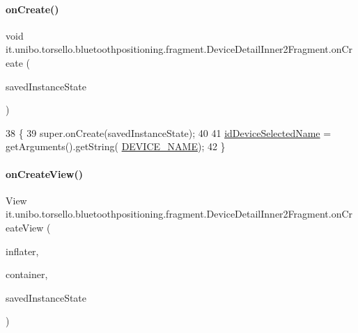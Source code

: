 \paragraph{\texorpdfstring{on\+Create()}{onCreate()}}
{\footnotesize\ttfamily void it.\+unibo.\+torsello.\+bluetoothpositioning.\+fragment.\+Device\+Detail\+Inner2\+Fragment.\+on\+Create (\begin{DoxyParamCaption}\item[{Bundle}]{saved\+Instance\+State }\end{DoxyParamCaption})}


\begin{DoxyCode}
38                                                     \{
39         super.onCreate(savedInstanceState);
40 
41         \hyperlink{classit_1_1unibo_1_1torsello_1_1bluetoothpositioning_1_1fragment_1_1DeviceDetailInner2Fragment_a84cd6ba00a3c2e8b7a53cac62c73f1b5_a84cd6ba00a3c2e8b7a53cac62c73f1b5}{idDeviceSelectedName} = getArguments().getString(
      \hyperlink{classit_1_1unibo_1_1torsello_1_1bluetoothpositioning_1_1fragment_1_1DeviceDetailInner2Fragment_aa28d537983d4cf578120a9c51eb2b0bb_aa28d537983d4cf578120a9c51eb2b0bb}{DEVICE\_NAME});
42     \}
\end{DoxyCode}
\hypertarget{classit_1_1unibo_1_1torsello_1_1bluetoothpositioning_1_1fragment_1_1DeviceDetailInner2Fragment_aaaab1478726f0d8a4b9bdfe3eab122c8_aaaab1478726f0d8a4b9bdfe3eab122c8}{}\label{classit_1_1unibo_1_1torsello_1_1bluetoothpositioning_1_1fragment_1_1DeviceDetailInner2Fragment_aaaab1478726f0d8a4b9bdfe3eab122c8_aaaab1478726f0d8a4b9bdfe3eab122c8} 
\paragraph{\texorpdfstring{on\+Create\+View()}{onCreateView()}}
{\footnotesize\ttfamily View it.\+unibo.\+torsello.\+bluetoothpositioning.\+fragment.\+Device\+Detail\+Inner2\+Fragment.\+on\+Create\+View (\begin{DoxyParamCaption}\item[{Layout\+Inflater}]{inflater,  }\item[{View\+Group}]{container,  }\item[{Bundle}]{saved\+Instance\+State }\end{DoxyParamCaption})}


